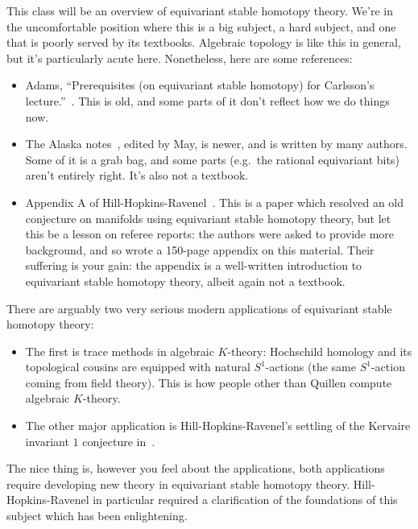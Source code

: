 
This class will be an overview of equivariant stable homotopy theory. We're in the uncomfortable position where
this is a big subject, a hard subject, and one that is poorly served by its textbooks. Algebraic topology is like
this in general, but it's particularly acute here. Nonetheless, here are some references:
\begin{itemize}
	\item Adams, ``Prerequisites (on equivariant stable homotopy) for Carlsson's lecture.''~\cite{Adams84}. This is
	old, and some parts of it don't reflect how we do things now.
	\item The Alaska notes~\cite{AlaskaNotes}, edited by May, is newer, and is written by many authors. Some of it
	is a grab bag, and some parts (e.g.\ the rational equivariant bits) aren't entirely right. It's also not a
	textbook.
	\item Appendix A of Hill-Hopkins-Ravenel~\cite{HHR}. This is a paper which resolved an old conjecture on
	manifolds using equivariant stable homotopy theory, but let this be a lesson on referee reports: the authors
	were asked to provide more background, and so wrote a 150-page appendix on this material. Their suffering is
	your gain: the appendix is a well-written introduction to equivariant stable homotopy theory, albeit again not
	a textbook.
\end{itemize}

There are arguably two very serious modern applications of equivariant stable homotopy theory: 

\begin{itemize}
	\item The first is trace methods in algebraic $K$-theory: Hochschild homology and its topological cousins are
	equipped with natural $S^1$-actions (the same $S^1$-action coming from field theory). This is how people
	other than Quillen compute algebraic $K$-theory.
	\item The other major application is Hill-Hopkins-Ravenel's settling of the Kervaire invariant $1$ conjecture
	in~\cite{HHR}.
\end{itemize}
The nice thing is, however you feel about the applications, both applications require developing new theory in
equivariant stable homotopy theory. Hill-Hopkins-Ravenel in particular required a clarification of the foundations
of this subject which has been enlightening.


